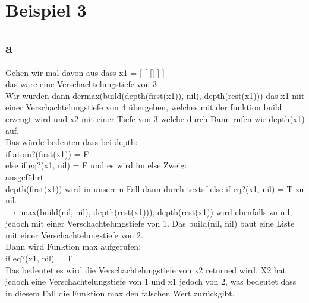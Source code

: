 \documentclass[12pt,runningheads,a4paper]{llncs}
\begin{document}
\section*{Beispiel 3}
\subsection*{a}
Gehen wir mal davon aus dass \textsf{x1 = [ [ [] ] ]}  \\
das wäre eine Verschachtelungstiefe von 3\\
Wir würden dann der\textsf{max(build(depth(first(x1)), nil), depth(rest(x1))) das x1 mit einer Verschachtelungstiefe von 4 übergeben, welches mit der funktion build erzeugt wird und x2 mit einer Tiefe von 3 welche durch 
Dann rufen wir depth(x1) auf.\\
Das würde bedeuten dass bei depth:\\
\textsf{if atom?(first(x1)) = F}\\ 
\textsf{else if eq?(x1, nil) = F} und es wird im else Zweig:\\
} ausgeführt\\
\textsf{depth(first(x1))} wird in unserem Fall dann durch textsf{ else if eq?(x1, nil) = T} zu \textsf{nil}.\\
$\rightarrow$  \textsf{max(build(nil, nil), depth(rest(x1)))},  \textsf{depth(rest(x1))} wird ebenfalls zu \textsf{nil}, jedoch mit einer Verschachtelungstiefe von 1. Das \textsf{build(nil, nil)} baut eine Liste mit einer Verschachtelungstiefe von 2.\\
Dann wird Funktion max aufgerufen:\\
\textsf{if eq?(x1, nil) = T}\\
Das bedeutet es wird die Verschachtelungstiefe von x2 returned wird. X2 hat jedoch eine Verschachtelungstiefe von 1 und x1 jedoch von 2, was bedeutet dass in diesem Fall die Funktion max den falschen Wert zurückgibt.
\newpage
\end{document}
